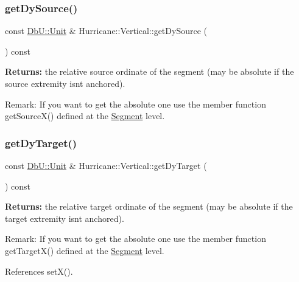 \subsubsection{\texorpdfstring{get\+Dy\+Source()}{getDySource()}}
{\footnotesize\ttfamily const \hyperlink{group__DbUGroup_ga4fbfa3e8c89347af76c9628ea06c4146}{Db\+U\+::\+Unit} \& Hurricane\+::\+Vertical\+::get\+Dy\+Source (\begin{DoxyParamCaption}{ }\end{DoxyParamCaption}) const\hspace{0.3cm}{\ttfamily [inline]}}

{\bfseries Returns\+:} the relative source ordinate of the segment (may be absolute if the source extremity isn\textquotesingle{}t anchored).

\begin{DoxyParagraph}{Remark\+:}
If you want to get the absolute one use the member function get\+Source\+X() defined at the \hyperlink{classHurricane_1_1Segment}{Segment} level. 
\end{DoxyParagraph}
\mbox{\label{classHurricane_1_1Vertical_af9ae34d224436db7c4c30f18fbd8f9a3}} 
\subsubsection{\texorpdfstring{get\+Dy\+Target()}{getDyTarget()}}
{\footnotesize\ttfamily const \hyperlink{group__DbUGroup_ga4fbfa3e8c89347af76c9628ea06c4146}{Db\+U\+::\+Unit} \& Hurricane\+::\+Vertical\+::get\+Dy\+Target (\begin{DoxyParamCaption}{ }\end{DoxyParamCaption}) const\hspace{0.3cm}{\ttfamily [inline]}}

{\bfseries Returns\+:} the relative target ordinate of the segment (may be absolute if the target extremity isn\textquotesingle{}t anchored).

\begin{DoxyParagraph}{Remark\+:}
If you want to get the absolute one use the member function get\+Target\+X() defined at the \hyperlink{classHurricane_1_1Segment}{Segment} level. 
\end{DoxyParagraph}


References set\+X().

